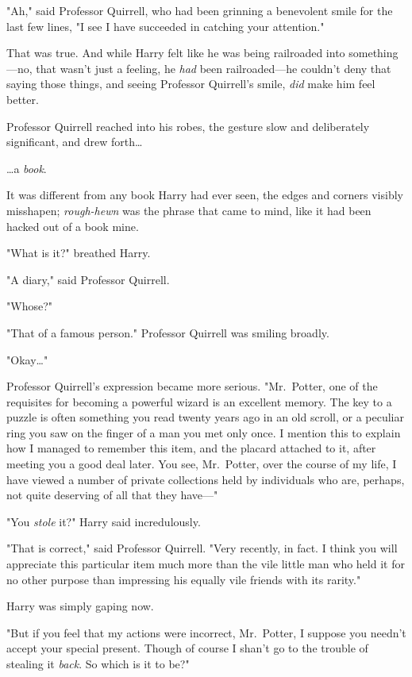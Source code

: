 "Ah," said Professor Quirrell, who had been grinning a benevolent smile for the 
last few lines, "I see I have succeeded in catching your attention."

That was true. And while Harry felt like he was being railroaded into 
something---no, that wasn't just a feeling, he \emph{had} been railroaded---he 
couldn't deny that saying those things, and seeing Professor Quirrell's smile, 
\emph{did} make him feel better.

Professor Quirrell reached into his robes, the gesture slow and deliberately 
significant, and drew forth{\ldots}

{\ldots}a \emph{book}.

It was different from any book Harry had ever seen, the edges and corners 
visibly misshapen; \emph{rough-hewn} was the phrase that came to mind, like it 
had been hacked out of a book mine.

"What is it?" breathed Harry.

"A diary," said Professor Quirrell.

"Whose?"

"That of a famous person." Professor Quirrell was smiling broadly.

"Okay{\ldots}"

Professor Quirrell's expression became more serious. "Mr.~Potter, one of the 
requisites for becoming a powerful wizard is an excellent memory. The key to a 
puzzle is often something you read twenty years ago in an old scroll, or a 
peculiar ring you saw on the finger of a man you met only once. I mention this 
to explain how I managed to remember this item, and the placard attached to it, 
after meeting you a good deal later. You see, Mr.~Potter, over the course of my 
life, I have viewed a number of private collections held by individuals who 
are, perhaps, not quite deserving of all that they have---"

"You \emph{stole} it?" Harry said incredulously.

"That is correct," said Professor Quirrell. "Very recently, in fact. I think 
you will appreciate this particular item much more than the vile little man who 
held it for no other purpose than impressing his equally vile friends with its 
rarity."

Harry was simply gaping now.

"But if you feel that my actions were incorrect, Mr.~Potter, I suppose you 
needn't accept your special present. Though of course I shan't go to the 
trouble of stealing it \emph{back}. So which is it to be?"

